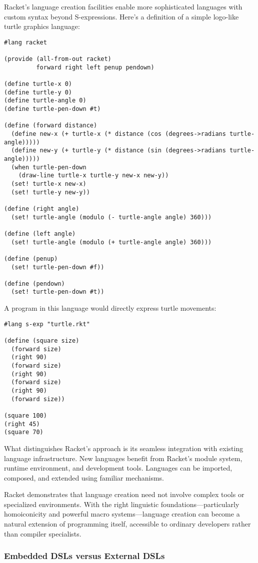 \documentclass[11pt]{article}
\begin{document}
Racket's language creation facilities enable more sophisticated languages with custom syntax beyond S-expressions. Here's a definition of a simple logo-like turtle graphics language:

\begin{verbatim}
#lang racket

(provide (all-from-out racket)
         forward right left penup pendown)

(define turtle-x 0)
(define turtle-y 0)
(define turtle-angle 0)
(define turtle-pen-down #t)

(define (forward distance)
  (define new-x (+ turtle-x (* distance (cos (degrees->radians turtle-angle)))))
  (define new-y (+ turtle-y (* distance (sin (degrees->radians turtle-angle)))))
  (when turtle-pen-down
    (draw-line turtle-x turtle-y new-x new-y))
  (set! turtle-x new-x)
  (set! turtle-y new-y))

(define (right angle)
  (set! turtle-angle (modulo (- turtle-angle angle) 360)))

(define (left angle)
  (set! turtle-angle (modulo (+ turtle-angle angle) 360)))

(define (penup)
  (set! turtle-pen-down #f))

(define (pendown)
  (set! turtle-pen-down #t))
\end{verbatim}

A program in this language would directly express turtle movements:

\begin{verbatim}
#lang s-exp "turtle.rkt"

(define (square size)
  (forward size)
  (right 90)
  (forward size)
  (right 90)
  (forward size)
  (right 90)
  (forward size))

(square 100)
(right 45)
(square 70)
\end{verbatim}

What distinguishes Racket's approach is its seamless integration with existing language infrastructure. New languages benefit from Racket's module system, runtime environment, and development tools. Languages can be imported, composed, and extended using familiar mechanisms.

Racket demonstrates that language creation need not involve complex tools or specialized environments. With the right linguistic foundations—particularly homoiconicity and powerful macro systems—language creation can become a natural extension of programming itself, accessible to ordinary developers rather than compiler specialists.
\subsubsection{Embedded DSLs versus External DSLs}
\label{sec:org728756f}
\end{document}
